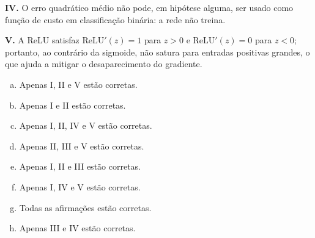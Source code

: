 \documentclass{dlproblemset}
\begin{document}
\begin{enumerate}[1)]
    \textbf{IV.} O erro quadrático médio não pode, em hipótese alguma, ser usado como função de custo em classificação binária: a rede não treina.

    \textbf{V.} A ReLU satisfaz $\mathrm{ReLU}'(z) = 1$ para $z > 0$ e $\mathrm{ReLU}'(z) = 0$ para $z < 0$; portanto, ao contrário da sigmoide, não satura para entradas positivas grandes, o que ajuda a mitigar o desaparecimento do gradiente.

    \begin{enumerate}[(a)]
        \item Apenas I, II e V estão corretas.
        \item Apenas I e II estão corretas.
        \item Apenas I, II, IV e V estão corretas.
        \item Apenas II, III e V estão corretas.
        \item Apenas I, II e III estão corretas.
        \item Apenas I, IV e V estão corretas.
        \item Todas as afirmações estão corretas.
        \item Apenas III e IV estão corretas.
    \end{enumerate}


\end{enumerate}
\end{document}

